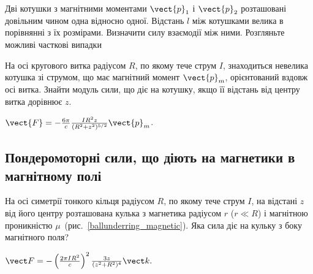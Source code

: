 \begin{problem}
    Дві котушки з магнітними моментами $\vect{p}_1$ і $\vect{p}_2$ розташовані довільним чином одна відносно одної. Відстань $l$ між котушками велика в порівнянні з їх розмірами. Визначити силу взаємодії між ними. Розгляньте можливі часткові випадки
\end{problem}

\begin{problem}
    На осі кругового витка радіусом $R$, по якому тече струм $I$, знаходиться невелика котушка зі струмом, що має магнітний момент $\vect{p}_m$, орієнтований вздовж осі витка. Знайти модуль сили, що діє на котушку, якщо її відстань від центру витка дорівнює $z$.
\begin{solution}
	$\vect{F} = -\frac{6\pi}{c}\frac{IR^2z}{(R^2 + z^2)^{5/2}}\vect{p}_m$.
\end{solution}
\end{problem}



%	

\subsection*{Пондеромоторні сили, що діють на магнетики в магнітному полі}


\begin{problem}\label{prb:ballunderring_magnetic}
На осі симетрії тонкого кільця радіусом $R$, по якому тече струм $I$, на відстані $z$ від його центру розташована кулька з магнетика радіусом $r$ ($r \ll R$) і магнітною проникністю $\mu$~(рис.~\ref{ballunderring_magnetic}). Яка сила діє на кульку з боку магнітного поля?
\begin{solution}
	$\vect F = - \left( \frac{2\pi IR^2}{c}\right)^2 \frac{3z}{(z^2 + R^2)^4} \vect k.$
\end{solution}
\end{problem}

